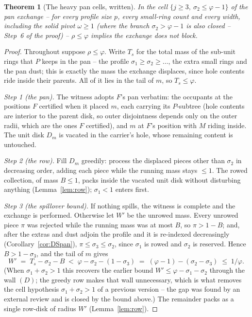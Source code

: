 \documentclass[11pt]{article}
\newtheorem{theorem}{Theorem}
\theoremstyle{definition}
\begin{document}
\begin{theorem}[The heavy pan cells, written]\label{thm:D1written}
In the cell $\{j\ge3,\ \sigma_2\le\varphi-1\}$
of the pan exchange -- for every profile size $p$, every small-ring
count and every width, including the solid pivot $\omega\ge1$
(where the branch $\sigma_2>\varphi-1$ is also closed --
Step~6 of the proof) -- $\rho\le\varphi$ implies the exchange does
not block.
\end{theorem}
\begin{proof}
Throughout suppose $\rho\le\varphi$. Write $T_s$ for the total mass
of the sub-unit rings that $P$ keeps in the pan -- the profile
$\sigma_1\ge\sigma_2\ge\dots$, the extra small rings and the pan
dust; this is exactly the mass the exchange displaces, since hole
contents ride inside their parents. All of it lies in the tail of
$m$, so $T_s\le\varphi$.

\emph{Step 1 (the pan).} The witness adopts $F$'s pan verbatim: the
occupants at the positions $F$ certified when it placed $m$, each
carrying its $P$-subtree (hole contents are interior to the parent
disk, so outer disjointness depends only on the outer radii, which
are the ones $F$ certified), and $m$ at $F$'s position with $M$
riding inside. The unit disk $D_m$ is vacated in the carrier's hole,
whose remaining content is untouched.

\emph{Step 2 (the row).} Fill $D_m$ greedily: process the displaced
pieces other than $\sigma_2$ in decreasing order, adding each piece
while the running mass stays $\le1$. The rowed collection, of mass
$B\le1$, packs inside the vacated unit disk without disturbing
anything (Lemma~\ref{lem:row}); $\sigma_1<1$ enters first.

\emph{Step 3 (the spillover bound).} If nothing spills, the witness
is complete and the exchange is performed. Otherwise let $W'$ be the
unrowed mass. Every unrowed piece $\pi$ was rejected while the
running mass was at most $B$, so $\pi>1-B$; and, after the
extras and dust adjoin the profile and it is re-indexed
decreasingly (Corollary~\ref{cor:DSpan}), $\pi\le\sigma_3\le
\sigma_2$, since $\sigma_1$ is rowed and $\sigma_2$ is reserved.
Hence $B>1-\sigma_3$, and the tail of $m$ gives
\[
W'\;=\;T_s-\sigma_2-B\;<\;\varphi-\sigma_2-(1-\sigma_3)
\;=\;(\varphi-1)-(\sigma_2-\sigma_3)\;\le\;1/\varphi .
\]
(When $\sigma_1+\sigma_2>1$ this recovers the earlier bound
$W'\le\varphi-\sigma_1-\sigma_2$ through the wall $(D)$; the greedy
row makes that wall unnecessary, which is what removes the cell
hypothesis $\sigma_1+\sigma_2>1$ of a previous version -- the gap
was found by an external review and is closed by the bound above.)
The remainder packs as a single row-disk of radius $W'$
(Lemma~\ref{lem:row}).


\end{proof}
\end{document}
